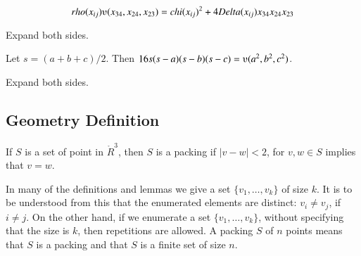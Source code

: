 \begin{tarskidata}
\begin{tarski}
\begin{lemma}
  $$\rho(x_{ij}) \ups(x_{34},x_{24},x_{23}) = \chi(x_{ij})^2 +
  4 \Delta(x_{ij}) x_{34} x_{24} x_{23}$$
\end{lemma}

\begin{proved} Expand both sides.
\swallowed\end{proved}
\end{tarski}



\begin{tarski}

\begin{lemma}
Let $s = (a+b+c)/2$.  Then $16 s(s-a)(s-b)(s-c) = \ups(a^2,b^2,c^2)$.
\end{lemma}

\begin{proved} Expand both sides. 
\swallowed\end{proved}
\end{tarski}









\begin{tarski}
\section{Geometry Definition}  

\begin{definition}[packing]
If $S$ is a set of point in $\ring{R}^3$, then
$S$ is a packing if $|v-w| < 2$, for $v,w\in S$ implies that $v=w$.
\end{definition}
In many of the definitions and lemmas we give a set $\{v_1,\ldots,v_k\}$
of size $k$.  It is to be understood from this  
that the enumerated elements are distinct: $v_i\ne v_j$, if $i\ne j$.
On the other hand, if we enumerate a set $\{v_1,\ldots,v_k\}$, without
specifying that the size is $k$, then repetitions are allowed.
A packing $S$ of $n$ points means that $S$ is a packing and that $S$
is a finite set of size $n$.
\end{tarski}




\end{tarskidata}
